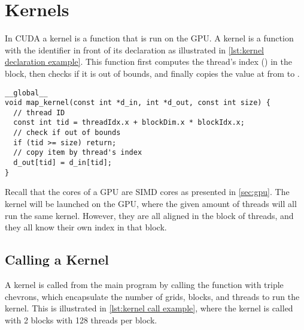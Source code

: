 \section{Kernels}
\label{sec:kernels}

In CUDA a kernel is a function that is run on the GPU.
A kernel is a function with the  identifier in front of its declaration as illustrated in \cref{lst:kernel declaration example}.
This function first computes the thread's index () in the block, then checks if it is out of bounds, and finally copies the value at  from  to .

\begin{lstlisting}[caption={Kernel declaration example}, label={lst:kernel declaration example}]
__global__
void map_kernel(const int *d_in, int *d_out, const int size) {
  // thread ID
  const int tid = threadIdx.x + blockDim.x * blockIdx.x;
  // check if out of bounds
  if (tid >= size) return;
  // copy item by thread's index
  d_out[tid] = d_in[tid];
}
\end{lstlisting}

Recall that the cores of a GPU are SIMD cores as presented in \cref{sec:gpu}.
The kernel will be launched on the GPU, where the given amount of threads will all run the same kernel.
However, they are all aligned in the block of threads, and they all know their own index in that block.

\subsection{Calling a Kernel}
\label{sec:calling a kernel}

A kernel is called from the main program by calling the function with triple chevrons, which encapsulate the number of grids, blocks, and threads to run the kernel.
This is illustrated in \cref{lst:kernel call example}, where the kernel is called with 2 blocks with 128 threads per block.

